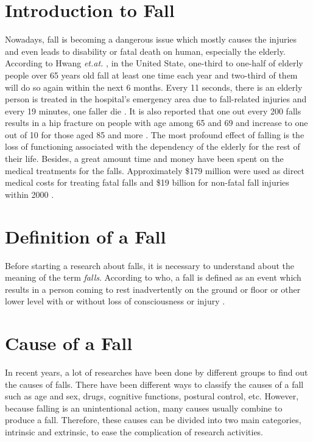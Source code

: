 \documentclass[letterpaper,12pt,titlepage,oneside,final]{book}
\begin{document}
\section{Introduction to Fall}
Nowadays, fall is becoming a dangerous issue which mostly causes the injuries and even leads to disability or fatal death on human, especially the elderly. According to Hwang \textit{et.at.} \cite{static1}, in the United State, one-third to one-half of elderly people over 65 years old fall at least one time each year  and two-third of them will do so again within the next 6 months. Every 11 seconds, there is an elderly person is treated in the hospital's emergency area due to fall-related injuries and every 19 minutes, one faller die \cite{ncoa}. It is also reported that one out every 200 falls results in a hip fracture on people with age among 65 and 69 and increase to one out of 10 for those aged 85 and more \cite{hip_fracture}. The most profound effect of falling is the loss of functioning associated with the dependency of the elderly for the rest of their life. Besides, a great amount time and money have been spent on the medical treatments for the falls. Approximately \$179 million were used as direct medical costs for treating fatal falls and \$19 billion for non-fatal fall injuries within 2000 \cite{cost_fatal}.

\section{Definition of a Fall}
Before starting a research about falls, it is necessary to understand about the meaning of the term \textit{falls}. According to \gls{who}, a fall is defined as an event which results in a person coming to rest inadvertently on the ground or floor or other lower level with or without loss of consciousness or injury \cite{who}. 

\section{Cause of a Fall}
In recent years, a lot of researches have been done by different groups to find out the causes of falls. There have been different ways to classify the causes of a fall such as age and sex, drugs, cognitive functions, postural control, etc. However, because falling is an unintentional action, many causes usually combine to produce a fall. Therefore, these causes can be divided into two main categories, intrinsic and extrinsic, to ease the complication of research activities.
\end{document}
